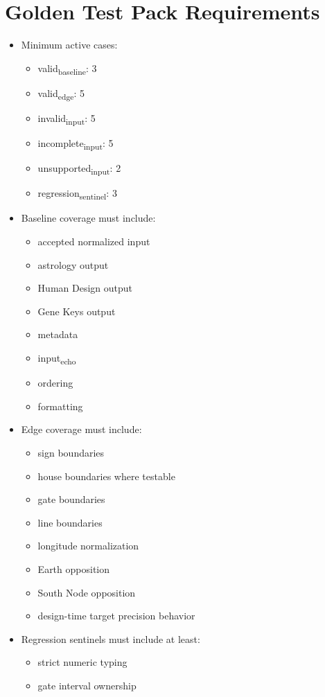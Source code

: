 \documentclass[11pt]{article}
\begin{document}
\section{Golden Test Pack Requirements}
\label{sec:orgc30e71e}
\begin{itemize}
\item Minimum active cases:
\begin{itemize}
\item valid\textsubscript{baseline}: 3
\item valid\textsubscript{edge}: 5
\item invalid\textsubscript{input}: 5
\item incomplete\textsubscript{input}: 5
\item unsupported\textsubscript{input}: 2
\item regression\textsubscript{sentinel}: 3
\end{itemize}
\item Baseline coverage must include:
\begin{itemize}
\item accepted normalized input
\item astrology output
\item Human Design output
\item Gene Keys output
\item metadata
\item input\textsubscript{echo}
\item ordering
\item formatting
\end{itemize}
\item Edge coverage must include:
\begin{itemize}
\item sign boundaries
\item house boundaries where testable
\item gate boundaries
\item line boundaries
\item longitude normalization
\item Earth opposition
\item South Node opposition
\item design-time target precision behavior
\end{itemize}
\item Regression sentinels must include at least:
\begin{itemize}
\item strict numeric typing
\item gate interval ownership

\end{itemize}
\end{itemize}
\end{document}
